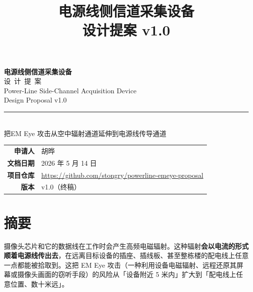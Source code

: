 \documentclass[a4paper,11pt,oneside,UTF8,scheme=plain]{ctexart}
\title{\vspace{-2em}\sffamily\bfseries 电源线侧信道采集设备\\[0.3em]\large 设计提案 v1.0}
\author{}
\date{}
\begin{document}

\thispagestyle{empty}
\vspace*{2cm}

\begin{center}
{\sffamily\bfseries\Huge 电源线侧信道采集设备}\\[0.6em]
{\sffamily\Large 设\ 计\ 提\ 案}\\[1.5em]
{\large Power-Line Side-Channel Acquisition Device}\\[0.3em]
{\normalsize Design Proposal v1.0}\\[2em]

\rule{0.6\textwidth}{0.4pt}\\[1em]

{\large\sffamily 把EM Eye 攻击从空中辐射通道延伸到电源线传导通道}\\[3em]

\begin{tabularx}{0.85\textwidth}{rX}
\sffamily\bfseries 申请人  & 胡晔 \\
\sffamily\bfseries 文档日期 & 2026 年 5 月 14 日 \\
\sffamily\bfseries 项目仓库 & \url{https://github.com/stongry/powerline-emeye-proposal} \\
\sffamily\bfseries 版本   & v1.0（终稿） \\
\end{tabularx}

\vfill

\vspace{1em}
\end{center}

\newpage

\tableofcontents
\newpage

\section*{摘要}

\begin{infobox}[title=核心论点]
摄像头芯片和它的数据线在工作时会产生高频电磁辐射。这种辐射\textbf{会以电流的形式顺着电源线传出去}，在远离目标设备的插座、插线板、甚至整栋楼的配电线上任意一点都能被拾取到。这把 EM Eye 攻击（一种利用设备电磁辐射、远程还原其屏幕或摄像头画面的窃听手段）的风险从「设备附近 5 米内」扩大到「配电线上任意位置、数十米远」。
\end{infobox}
\end{document}
